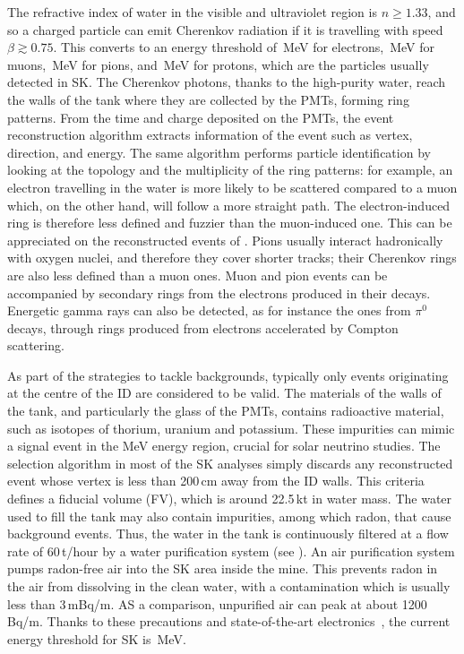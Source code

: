 The refractive index of water in the visible and ultraviolet region is $n \geq 1.33$, %
and so a charged particle can emit Cherenkov radiation if it is travelling %
with speed $\beta \gtrsim 0.75$.
This converts to an energy threshold of \,MeV for electrons, \,MeV for muons, %
\,MeV for pions, and \,MeV for protons, which are the particles usually detected in SK.
The Cherenkov photons, thanks to the high-purity water, reach the walls of the tank where they %
are collected by the PMTs, forming ring patterns.
From the time and charge deposited on the PMTs, the event reconstruction algorithm extracts information of the event %
such as vertex, direction, and energy.
The same algorithm performs particle identification by looking at the topology and the multiplicity of the ring patterns: %
for example, an electron travelling in the water is more likely to be scattered compared to a muon %
which, on the other hand, will follow a more straight path.
The electron-induced ring is therefore less defined and fuzzier than the muon-induced one.
This can be appreciated on the reconstructed events of .
Pions usually interact hadronically with oxygen nuclei, and therefore they cover shorter tracks; %
their Cherenkov rings are also less defined than a muon ones.
Muon and pion events can be accompanied by secondary rings from the electrons produced in their decays.
Energetic gamma rays can also be detected, as for instance the ones from $\pi^0$ decays, %
through rings produced from electrons accelerated by Compton scattering.


As part of the strategies to tackle backgrounds, typically only events originating at the centre %
of the ID are considered to be valid.
The materials of the walls of the tank, and particularly the glass of the PMTs, contains radioactive material, %
such as isotopes of thorium, uranium and potassium.
These impurities can mimic a signal event in the MeV energy region, crucial for solar neutrino studies.
The selection algorithm in most of the SK analyses simply discards any reconstructed event whose vertex is less than 200\,cm away from the ID walls.
This criteria defines a fiducial volume (FV), which is around 22.5\,kt in water mass.
The water used to fill the tank may also contain impurities, among which radon, that cause background events.
Thus, the water in the tank is continuously filtered at a flow rate of 60\,t/hour by a water purification system (see ).
An air purification system pumps radon-free air into the SK area inside the mine.
This prevents radon in the air from dissolving in the clean water, with a %
contamination which is usually less than 3\,mBq/m.
AS a comparison, unpurified air can peak at about 1200\,Bq/m.
Thanks to these precautions and state-of-the-art electronics~\cite{Nishino:2009zu}, the current energy threshold for SK is \,MeV.

